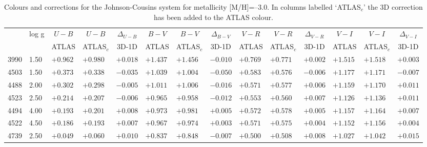 \documentclass[]{aa}
\def\teff{$T\rm_{eff}$}
\begin{document}
\begin{appendix}
\begin{table*}
\caption{\label{ubvrim30}
Colours and corrections for the Johnson-Cousins system for metallicity [M/H]=--3.0. In columns labelled `ATLAS$_c$' the 3D correction
has been added to the ATLAS colour. }
\renewcommand{\tabcolsep}{3pt}
\tabskip=0pt
\begin{center}
\begin{tabular}{llllllllllllll}
\hline\noalign{\smallskip}
\multicolumn{1}{c}{\teff} & 
\multicolumn{1}{c}{log g} & 
\multicolumn{1}{c}{$U-B$} &
\multicolumn{1}{c}{$U-B$} &
\multicolumn{1}{c}{$\Delta_{U-B}$} &
\multicolumn{1}{c}{$B-V$} &
\multicolumn{1}{c}{$B-V$} &
\multicolumn{1}{c}{$\Delta_{B-V}$} &
\multicolumn{1}{c}{$V-R$} &
\multicolumn{1}{c}{$V-R$} &
\multicolumn{1}{c}{$\Delta_{V-R}$} &
\multicolumn{1}{c}{$V-I$} &
\multicolumn{1}{c}{$V-I$} &
\multicolumn{1}{c}{$\Delta_{V-I}$} \\
\multicolumn{2}{c}{ } &  
\multicolumn{1}{c}{ATLAS} &
\multicolumn{1}{c}{ATLAS$_c$}&
\multicolumn{1}{c}{3D-1D}&
\multicolumn{1}{c}{ATLAS} &
\multicolumn{1}{c}{ATLAS$_c$}&
\multicolumn{1}{c}{3D-1D}&
\multicolumn{1}{c}{ATLAS} &
\multicolumn{1}{c}{ATLAS$_c$}&
\multicolumn{1}{c}{3D-1D}&
\multicolumn{1}{c}{ATLAS} &
\multicolumn{1}{c}{ATLAS$_c$}&
\multicolumn{1}{c}{3D-1D} \\
\hline\noalign{\smallskip}
\hline\noalign{\smallskip}
3990  &1.50& $ +0.962$&$  +0.980$&$  +0.018$&$  +1.437$&$  +1.456$&$  -0.010$&$  +0.769$&$  +0.771$&$  +0.002$&$  +1.515$&$  +1.518$&$  +0.003$\\
4503  &1.50& $ +0.373$&$  +0.338$&$  -0.035$&$  +1.039$&$  +1.004$&$  -0.050$&$  +0.583$&$  +0.576$&$  -0.006$&$  +1.177$&$  +1.171$&$  -0.007$\\
4488  &2.00& $ +0.302$&$  +0.298$&$  -0.005$&$  +1.011$&$  +1.006$&$  -0.016$&$  +0.571$&$  +0.577$&$  +0.006$&$  +1.159$&$  +1.170$&$  +0.011$\\
4523  &2.50& $ +0.214$&$  +0.207$&$  -0.006$&$  +0.965$&$  +0.958$&$  -0.012$&$  +0.553$&$  +0.560$&$  +0.007$&$  +1.126$&$  +1.136$&$  +0.011$\\
4494  &4.00& $ +0.193$&$  +0.201$&$  +0.008$&$  +0.973$&$  +0.981$&$  +0.005$&$  +0.572$&$  +0.578$&$  +0.005$&$  +1.157$&$  +1.164$&$  +0.007$\\
4522  &4.50& $ +0.186$&$  +0.193$&$  +0.007$&$  +0.967$&$  +0.974$&$  +0.003$&$  +0.571$&$  +0.575$&$  +0.004$&$  +1.152$&$  +1.156$&$  +0.004$\\
4739  &2.50& $ +0.049$&$  +0.060$&$  +0.010$&$  +0.837$&$  +0.848$&$  -0.007$&$  +0.500$&$  +0.508$&$  +0.008$&$  +1.027$&$  +1.042$&$  +0.015$\\

\end{tabular}
\end{center}
\end{table*}
\end{appendix}
\end{document}
